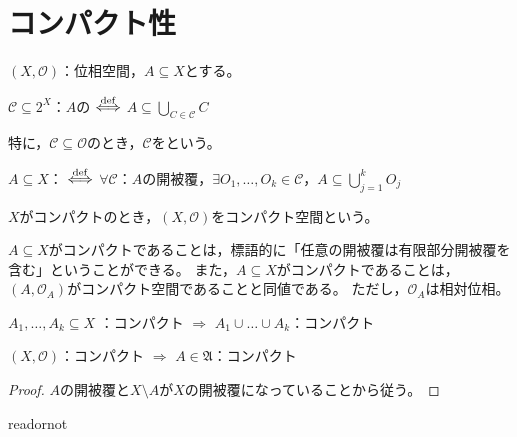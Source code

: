 \documentclass[uplatex]{jsarticle}
\begin{document}
\fi

\section{コンパクト性}
$(X, \mathcal{O})$：位相空間，$A \subseteq X$とする。

\begin{teigi}[被覆]
  $\mathcal{C} \subseteq 2^{X}$：$A$の $\overset{\mathrm{def}}{\Longleftrightarrow}$ ${\displaystyle A \subseteq \bigcup_{C \in \mathcal{C}} C}$

  特に，$\mathcal{C} \subseteq \mathcal{O}$のとき，$\mathcal{C}$をという。
\end{teigi}

\begin{teigi}[コンパクト]
   $A \subseteq X$： $\overset{\mathrm{def}}{\Longleftrightarrow}$ $\forall \mathcal{C}$：$A$の開被覆，$\exists O_{1}, \dots, O_{k} \in \mathcal{C}$，${\displaystyle A \subseteq \bigcup_{j=1}^{k} O_{j}}$

   $X$がコンパクトのとき，$(X, \mathcal{O})$をコンパクト空間という。
\end{teigi}

$A \subseteq X$がコンパクトであることは，標語的に「任意の開被覆は有限部分開被覆を含む」ということができる。
また，$A \subseteq X$がコンパクトであることは，$(A, \mathcal{O}_{A})$がコンパクト空間であることと同値である。
ただし，$\mathcal{O}_{A}$は相対位相。

\begin{hodai}
  $A_{1}, \dots, A_{k} \subseteq X$ ：コンパクト $\Longrightarrow$ $A_{1} \cup \dots \cup A_{k}$：コンパクト
\end{hodai}

\begin{hodai}
  $(X, \mathcal{O})$：コンパクト $\Longrightarrow$ $A \in \mathfrak{A}$：コンパクト
\end{hodai}

\begin{proof}
  $A$の開被覆と$X \setminus A$が$X$の開被覆になっていることから従う。
\end{proof}

\expandafter\ifx\csname readornot\endcsname\relax
  
\end{document}

